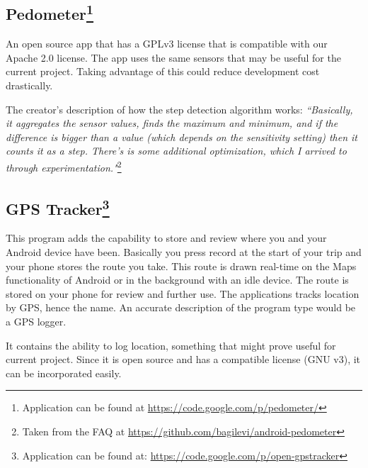 \subsection{Pedometer\footnote{Application can be found at \url{https://code.google.com/p/pedometer/}}}
An open source app that has a GPLv3 license that is compatible with our Apache 2.0 license. The app uses the same sensors that may be useful for the current project. Taking advantage of this could reduce development cost drastically.

The creator's description of how the step detection algorithm works: \textit{``Basically, it aggregates the sensor values, finds the maximum and minimum, and if the difference is bigger than a value (which depends on the sensitivity setting) then it counts it as a step. There's is some additional optimization, which I arrived to through experimentation."}\footnote{Taken from the FAQ at \url{https://github.com/bagilevi/android-pedometer}}

\subsection{GPS Tracker\footnote{Application can be found at: \url{https://code.google.com/p/open-gpstracker}}}
This program adds the capability to store and review where you and your Android device have been. Basically you press record at the start of your trip and your phone stores the route you take. This route is drawn real-time on the Maps functionality of Android or in the background with an idle device. The route is stored on your phone for review and further use. The applications tracks location by GPS, hence the name. An accurate description of the program type would be a GPS logger.

It contains the ability to log location, something that might prove useful for current project. Since it is open source and has a compatible license (GNU v3), it can be incorporated easily.

